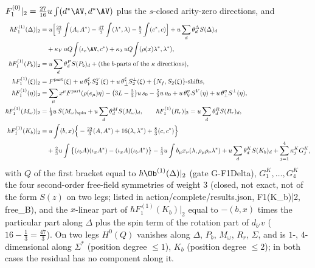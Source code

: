 \begin{proposition}
\label{prop:at-c-sol}
$F_1^{(0)}|_2=\tfrac{27}{16}u\int(d^*\AV,d^*\AV)$ plus the $s$-closed arity-zero directions, and
\[
\begin{aligned}
\hbar F_1^{(1)}(\Delta)|_2&=u\Big[\tfrac{22}3\int(A,A^*)-\tfrac{47}3\int(\lambda^*,\lambda)-\tfrac83\int(c^*,c)\Big]+u\sum_d\theta^\Delta_dS(\Delta)_d\\
&\quad+\kappa_V\,uQ\!\int(\iota_x\AV,c^*)+\kappa_\lambda\,uQ\!\int(\rho(x)\lambda^*,\lambda^*),\\
\hbar F_1^{(1)}(P_b)|_2&=u\sum_d\theta^P_dS(P_b)_d+(\text{the }b\text{-parts of the }\kappa\text{ directions}),\\
\hbar F_1^{(1)}(\xi)|_2&=F^{\rm part}(\xi)+u\,\theta^\xi_VS^V_2(\xi)+u\,\theta^\xi_\perp S^\perp_2(\xi)+\{N_f,S_2(\xi)\}\text{-shifts},\\
\hbar F_1^{(1)}(\eta)|_2&=\sum_\mu x^\mu F^{\rm part}(\rho(e_\mu)\eta)-\big(3L-\tfrac32\big)u\,s_0-\tfrac52u\,u_0+u\,\theta^{\eta}_VS^V(\eta)+u\,\theta^{\eta}_\perp S^\perp(\eta),\\
\hbar F_1^{(1)}(M_\omega)|_2&=\tfrac13u\,S(M_\omega)_{\rm spin}+u\sum_d\theta^M_dS(M_\omega)_d,\qquad \hbar F_1^{(1)}(R_r)|_2=u\sum_d\theta^R_dS(R_r)_d,\\
\hbar F_1^{(1)}(K_b)|_2&=u\int(b,x)\Big\{-\tfrac{22}3(A,A^*)+16(\lambda,\lambda^*)+\tfrac83(c,c^*)\Big\}\\
&\quad+\tfrac23u\int\big\{(\iota_bA)(\iota_xA^*)-(\iota_xA)(\iota_bA^*)\big\}-\tfrac13u\int b_\mu x_\nu(\lambda,\rho_\mu\rho_\nu\lambda^*)+u\sum_d\theta^K_dS(K_b)_d+\sum_{j=1}^4\kappa^K_jG^K_j,
\end{aligned}
\]
with $Q$ of the first bracket equal to $\hbar\Ob^{(1)}(\Delta)|_2$ (gate G-F1Delta), $G^K_1,\dots,G^K_4$ the four second-order free-field symmetries of weight $3$ (closed, not exact, not of the form $S(z)$ on two legs; listed in action/complete/results.json, F1(K\_b)|2, free\_B), and the $x$-linear part of $\hbar F_1^{(1)}(K_b)|_2$ equal to $-(b,x)$ times the particular part along $\Delta$ plus the spin term of the rotation part of $d_{b'}v$ ($16-\tfrac13=\tfrac{47}3$). On two legs $H^0(Q)$ vanishes along $\Delta$, $P_b$, $M_\omega$, $R_r$, $\Sigma$, and is $1$-, $4$-dimensional along $\Sigma^*$ (position degree $\le1$), $K_b$ (position degree $\le2$); in both cases the residual has no component along it.
\end{proposition}

